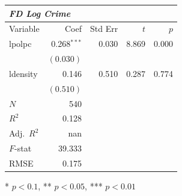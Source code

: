 \renewcommand{\arraystretch}{1.1}
\setlength{\tabcolsep}{6pt}
\begin{table}[H]
\centering
\begin{tabular}{lrrrr}
\hline
\multicolumn{5}{l}{\textit{FD Log Crime}} \\
\hline
Variable & Coef & Std Err & $t$ & $p$ \\
\hline
lpolpc & 0.268$^{\ast\ast\ast}$ & 0.030 & 8.869 & 0.000 \\
 & $(0.030)$ & & & \\
ldensity & 0.146 & 0.510 & 0.287 & 0.774 \\
 & $(0.510)$ & & & \\
\hline
$N$ & 540 & & & \\
$R^2$ & 0.128 & & & \\
Adj.\ $R^2$ & nan & & & \\
$F$-stat & 39.333 & & & \\
RMSE & 0.175 & & & \\
\hline
\end{tabular}
\end{table}
\vspace{2pt}
\begin{flushleft}\footnotesize{* $p<0.1$, ** $p<0.05$, *** $p<0.01$}\end{flushleft}